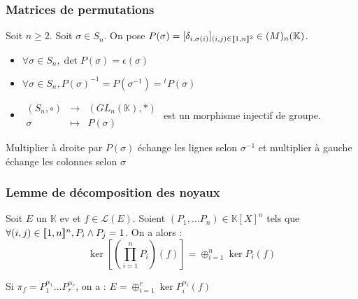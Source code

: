 \subsubsection{Matrices de permutations}
\begin{defi} Soit $n\geq 2$. Soit $\sigma\in S_n$. On pose $P(\sigma) = [\delta_{i,\sigma(i)}]_{(i,j)\in\llbracket 1, n \rrbracket^2}\in\mathscr(M)_n(\mathbb{K})$.
\end{defi}

\begin{prop}\begin{itemize}
    \item $\forall\sigma\in S_n, \det P(\sigma) = \epsilon(\sigma)$
    \item $\forall\sigma\in S_n, P(\sigma)^{-1} = P(\sigma^{-1}) = {}^tP(\sigma)$
    \item $\begin{array}{ccc} (S_n, \circ) & \rightarrow & (GL_n(\mathbb{K}), *) \\ \sigma & \mapsto & P(\sigma) \end{array}$ est un morphisme injectif de groupe.
\end{itemize}\end{prop}

\begin{prop} Multiplier à droite par $P(\sigma)$ échange les lignes selon $\sigma^{-1}$ et multiplier à gauche échange les colonnes selon $\sigma$
\end{prop}

\subsubsection{Lemme de décomposition des noyaux}
\begin{lemme} Soit $E$ un $\mathbb{K}$ ev et $f\in\mathscr{L}(E)$. Soient $(P_1,\ldots P_n)\in \mathbb{K}[X]^n$ tels que $\forall (i,j)\in\llbracket 1, n \rrbracket^n, P_i\wedge P_j = 1$. On a alors :
    \[ \ker\left[\left(\prod_{i=1}^n P_i\right)(f)\right] = \oplus_{i=1}^n \ker P_i(f) \]
\end{lemme}

\begin{prop} Si $\pi_f = P_1^{\alpha_1}\ldots P_r^{\alpha_r}$, on a : $E = \oplus_{i=1}^r \ker P_i^{\alpha_i}(f)$
\end{prop}

